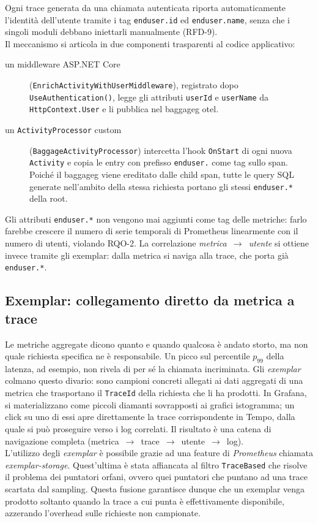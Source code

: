Ogni trace generata da una chiamata autenticata riporta automaticamente l'identità
dell'utente tramite i tag \texttt{enduser.id} ed \texttt{enduser.name}, senza che i
singoli moduli debbano iniettarli manualmente (RFD-9).\\
Il meccanismo si articola in due componenti trasparenti al codice applicativo:
\begin{description}
      \item[un middleware ASP.NET Core] (\texttt{EnrichActivityWithUserMiddleware}), registrato dopo \texttt{UseAuthentication()},
            legge gli attributi \texttt{userId} e \texttt{userName} da \texttt{HttpContext.User} e li
            pubblica nel \gls{baggageg} \gls{otel}.
      \item[un \texttt{ActivityProcessor} custom] (\texttt{BaggageActivityProcessor}) intercetta l'hook \texttt{OnStart} di ogni nuova
            \texttt{Activity} e copia le entry con prefisso \texttt{enduser.} come tag sullo span.
            Poiché il \gls{baggageg} viene ereditato dalle child span, tutte le query SQL generate
            nell'ambito della stessa richiesta portano gli stessi \texttt{enduser.*} della root.
\end{description}
Gli attributi \texttt{enduser.*} non vengono mai aggiunti come tag delle metriche:
farlo farebbe crescere il numero di serie temporali di Prometheus
linearmente con il numero di utenti, violando RQO-2. La correlazione \emph{metrica~$\to$~utente}
si ottiene invece tramite gli exemplar: dalla metrica si naviga alla trace, che porta
già \texttt{enduser.*}.

\subsection{Exemplar: collegamento diretto da metrica a trace}
\label{sec:modello-exemplars}
Le metriche aggregate dicono quanto e quando qualcosa è andato storto, ma
non quale richiesta specifica ne è responsabile. Un picco sul percentile $p_{99}$
della latenza, ad esempio, non rivela di per sé la chiamata incriminata. Gli
\emph{exemplar} colmano questo divario: sono campioni concreti allegati ai dati aggregati
di una metrica che trasportano il \texttt{TraceId} della richiesta che li ha prodotti.
In Grafana, si materializzano come piccoli diamanti sovrapposti ai grafici istogramma;
un click su uno di essi apre direttamente la trace corrispondente in Tempo, dalla quale
si può proseguire verso i log correlati. Il risultato è una catena di navigazione
completa (metrica~$\to$~trace~$\to$~utente~$\to$~log).\\
L'utilizzo degli \emph{exemplar} è possibile grazie ad una feature di \emph{Prometheus}
chiamata \emph{exemplar-storage}. Quest'ultima è stata affiancata al filtro \texttt{TraceBased}
che risolve il problema dei puntatori orfani, ovvero quei puntatori che puntano ad una trace
scartata dal sampling. Questa fusione garantisce dunque che un exemplar venga prodotto
soltanto quando la trace a cui punta è effettivamente
disponibile, azzerando l'overhead sulle richieste non campionate.

